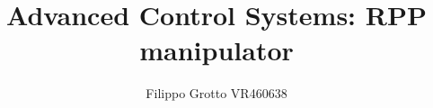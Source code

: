 \documentclass[a4paper,12pt]{article}
\begin{document}
\author{Filippo Grotto VR460638}

\title{Advanced Control Systems: RPP manipulator}

\maketitle
\tableofcontents




\end{document}
